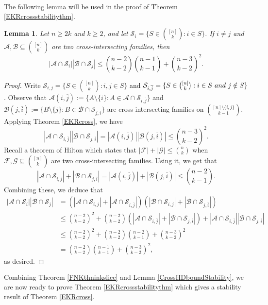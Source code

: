 \documentclass[10pt,a4paper]{amsart}
\numberwithin{equation}{section}
\newtheorem{lemma}[theorem]{Lemma}
\def\A{\mathcal{A}}
\def\B{\mathcal{B}}
\def\F{\mathcal{F}}
\def\G{\mathcal{G}}
\begin{document}
The following lemma will be used in the proof of Theorem
\ref{EKRcrossstabilitythm}.


\begin{lemma}\label{crossstarlemma}
Let $n \geq 2k$ and $k\geq 2$, and let $\mathcal{S}_i=\{S\in \binom{[n]}{k}: i\in S\}$.
If $i\neq j$ and $\A,\B\subseteq \binom{[n]}{k}$ are two cross-intersecting families, then
$$|\A\cap \mathcal{S}_i|  |\B\cap \mathcal{S}_j|
\leq \binom{n-2}{k-2}\binom{n-1}{k-1}+\binom{n-3}{k-2}^2.$$
\end{lemma}
\begin{proof}
Write $\mathcal{S}_{i,j}=\{S\in \binom{[n]}{k}: i,j\in S\}$ and $\mathcal{S}_{i,\overline{j}}=
\{S\in \binom{[n]}{k}: i \in S {~\rm and~} j\notin S\}$.
Observe that $\A(i,\overline{j}):=\{A\setminus \{i \} : A\in \A\cap \mathcal{S}_{i,\overline{j}}\}$ and
$\B(j,\overline{i}):=\{B\setminus \{ j\} : B\in \B\cap \mathcal{S}_{j,\overline{i}}\}$ are cross-intersecting families on $\binom{[n]\setminus \{i,j\}}{k-1}$.
Applying Theorem \ref{EKRcross}, we have
$$|\A\cap \mathcal{S}_{i,\overline{j}} |
|\B\cap \mathcal{S}_{j,\overline{i}} |
=|\A(i,\overline{j})|
|\B(j,\overline{i})|
\leq \binom{n-3}{k-2}^2.$$
Recall a theorem of Hilton \cite[Theorem 1]{Hilton} which states that
$|\F|+|\G| \leq \binom{n}{k}$ when $\F,\G\subseteq \binom{[n]}{k}$ are
two cross-intersecting families.
Using it, we get that
$$|\A\cap \mathcal{S}_{i,\overline{j}} | +
|\B\cap \mathcal{S}_{j,\overline{i}} |
=|\A(i,\overline{j})|+|\B(j,\overline{i})|
\leq \binom{n-2}{k-1}.$$
Combining these, we deduce that
\begin{align*}
|\A\cap \mathcal{S}_i|  |\B\cap \mathcal{S}_j|
&=\left(|\A\cap \mathcal{S}_{i,j}|+|\A\cap \mathcal{S}_{i,\overline{j}}|\right) \left(|\B\cap \mathcal{S}_{i,j}|+|\B\cap \mathcal{S}_{j,\overline{i}}|\right) \\
&\leq \binom{n-2}{k-2}^2+ \binom{n-2}{k-2}
\left(|\A\cap \mathcal{S}_{i,\overline{j}} | +
|\B\cap \mathcal{S}_{j,\overline{i}} |\right)
+|\A\cap \mathcal{S}_{i,\overline{j}} |
|\B\cap \mathcal{S}_{j,\overline{i}} |\\
&\leq \binom{n-2}{k-2}^2+\binom{n-2}{k-2}\binom{n-2}{k-1}+ \binom{n-3}{k-2}^2\\
&=\binom{n-2}{k-2}\binom{n-1}{k-1}+\binom{n-3}{k-2}^2,
\end{align*}
as desired.
\end{proof}



Combining Theorem \ref{FNKthninkslice} and Lemma \ref{CrossHDboundStability},
we are now ready to prove Theorem \ref{EKRcrossstabilitythm} which gives
a stability result of Theorem \ref{EKRcross}.
\end{document}
